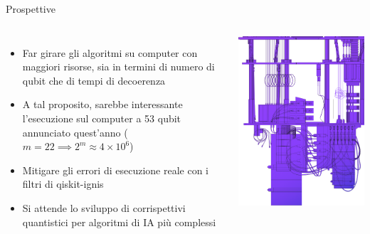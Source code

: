 \documentclass{beamer}
\begin{document}
    \begin{frame}{Prospettive}
        \begin{columns}
            \begin{itemize}
                \item Far girare gli algoritmi su computer con maggiori risorse, sia in termini di numero di qubit che di tempi di decoerenza
                \item A tal proposito, sarebbe interessante l'esecuzione sul computer 
                a 53 qubit annunciato quest'anno ($m = 22 \implies 2^m \approx 4 \times 10^6$)
                \item Mitigare gli errori di esecuzione reale con i filtri di qiskit-ignis
                \item Si attende lo sviluppo di corrispettivi quantistici per algoritmi di IA più complessi
            \end{itemize}
            \includegraphics[width=\linewidth]{gfx/quantum_computer.png}
        \end{columns}
    \end{frame}
\end{document}
